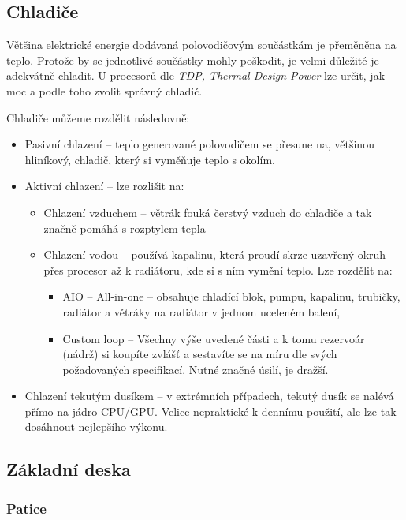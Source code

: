 \documentclass[a4paper]{article}
\begin{document}
    \subsection{Chladiče}
        Většina elektrické energie dodávaná polovodičovým součástkám je přeměněna na teplo. Protože by se jednotlivé součástky mohly poškodit, je velmi důležité je adekvátně chladit. U procesorů dle \textit{TDP, Thermal Design Power} lze určit, jak moc  a podle toho zvolit správný chladič. \par
        Chladiče můžeme rozdělit následovně:
        \begin{itemize}
            \item Pasivní chlazení -- teplo generované polovodičem se přesune na, většinou hliníkový, chladič, který si vyměňuje teplo s okolím.
            \item Aktivní chlazení -- lze rozlišit na:
            \begin{itemize}
                \item Chlazení vzduchem -- větrák fouká čerstvý vzduch do chladiče a tak značně pomáhá s rozptylem tepla
                \item Chlazení vodou -- používá kapalinu, která proudí skrze uzavřený okruh přes procesor až k radiátoru, kde si s ním vymění teplo. Lze rozdělit na:
                \begin{itemize}
                    \item AIO -- All-in-one -- obsahuje chladící blok, pumpu, kapalinu, trubičky, radiátor a větráky na radiátor v jednom uceleném balení, 
                    \item Custom loop -- Všechny výše uvedené části a k tomu rezervoár (nádrž) si koupíte zvlášť a sestavíte se na míru dle svých požadovaných specifikací. Nutné značné úsilí, je dražší.
                \end{itemize}
            \end{itemize}
            \item Chlazení tekutým dusíkem -- v extrémních případech, tekutý dusík se nalévá přímo na jádro CPU/GPU. Velice nepraktické k dennímu použití, ale lze tak dosáhnout nejlepšího výkonu.
        \end{itemize}
    \subsection{Základní deska}
        \subsubsection{Patice}
\end{document}
